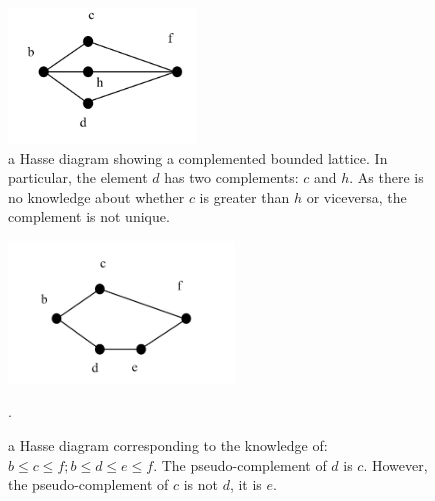 \documentclass[
		twoside,openright,titlepage,numbers=noenddot,manychapters,
		headinclude,%
                footinclude=false,cleardoublepage=empty,
                BCOR=5mm,
		fontsize=11pt, %
                 enabledeprecatedfontcommands]{scrreprt}
\begin{document}
\begin{figure}[]

\begin{center}

\includegraphics[width=5cm]{figures/diamond_complement.jpg}
\caption{a Hasse diagram showing a complemented bounded lattice. In particular, the element $d$ has two complements:  $c$ and $h$. As there is no knowledge about whether $c$ is greater than $h$ or viceversa, the complement is not unique. }
\label{fig_diamond_complement}

\end{center}

\end{figure}



\begin{figure}[]
\begin{center}

\includegraphics[width=6cm]{figures/simple_hasse_2.jpg}
\caption{a Hasse diagram corresponding to the knowledge of: $b \leq c \leq f ; b\leq d \leq e \leq f$. The pseudo-complement of $d$ is $c$. However, the pseudo-complement of $c$ is not $d$, it is $e$.%
}.
\label{fig_simple_hasse}
\end{center}
\end{figure}
\end{document}
